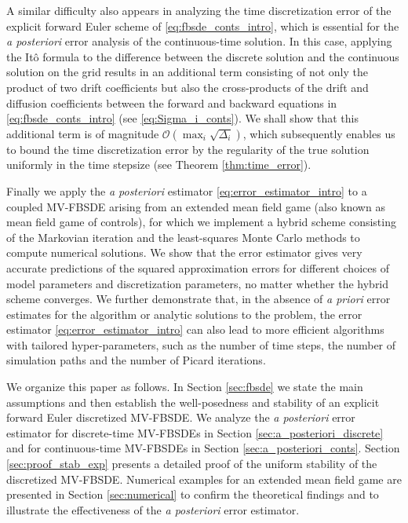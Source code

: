 \documentclass[11pt]{article}
\numberwithin{equation}{section}
\theoremstyle{definition}
\theoremstyle{remark}
\def\cO{\mathcal{O}}
\begin{document}
A similar difficulty also appears in analyzing the time discretization error of 
the explicit forward Euler scheme of \eqref{eq:fbsde_conts_intro},
which is essential for the \textit{a posteriori} error
analysis of  the continuous-time solution.
In this case,  
applying  the It\^{o} formula to the difference between the discrete solution and
the continuous solution on the grid
results in an  additional term consisting of not only   the product of two drift coefficients
but also the cross-products 
of the drift and diffusion coefficients between the forward and backward equations in \eqref{eq:fbsde_conts_intro}
(see \eqref{eq:Sigma_i_conts}).
We shall show that this additional term is of  magnitude $\cO(\max_i \sqrt{\Delta_i})$,
which subsequently enables us to bound the time discretization error by the regularity of the true solution
uniformly in the time stepsize (see Theorem \ref{thm:time_error}).

Finally we apply the \textit{a posteriori} estimator \eqref{eq:error_estimator_intro}
 to a coupled MV-FBSDE arising from 
an extended mean field game (also known as mean field game of controls),
for which we implement 
a hybrid scheme consisting of 
the Markovian  iteration  \cite{bender2008}
and the least-squares Monte Carlo methods  \cite{gobet2006}
to compute  numerical solutions.
We show that the error estimator gives very accurate predictions of the  squared approximation errors 
for different choices of model parameters and discretization parameters,
no matter whether the hybrid scheme converges.
We further demonstrate that,
in the absence of   \textit{a priori} error estimates for the algorithm or  
 analytic solutions to the problem,
  the error estimator \eqref{eq:error_estimator_intro}
can also lead to more efficient algorithms with tailored hyper-parameters,
such as  the number of time steps, the number of simulation paths
{and the number of Picard iterations}.

We organize this paper as follows. 
In Section \ref{sec:fbsde} we state the main assumptions and 
then
establish the well-posedness and stability of an explicit forward Euler  discretized MV-FBSDE.
We 
analyze  the \textit{a posteriori} error estimator for  discrete-time MV-FBSDEs
in Section \ref{sec:a_posteriori_discrete}
and for continuous-time MV-FBSDEs in Section \ref{sec:a_posteriori_conts}.
Section \ref{sec:proof_stab_exp} presents 
a detailed proof of the uniform stability of 
the discretized MV-FBSDE.
Numerical examples for an extended mean field game 
are presented in Section \ref{sec:numerical}
to confirm the theoretical findings and to illustrate the effectiveness of 
the \textit{a posteriori} error estimator. 
\end{document}
